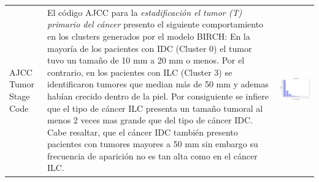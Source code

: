 \begin{table}[htb!]
	\footnotesize
	\begin{threeparttable}
		\begin{tabular}{p{2.5cm} p{7cm} p{6.5cm}} \toprule
			AJCC Tumor Stage Code 
			& 
			El código AJCC para la \textit{estadificación el tumor (T) primario del cáncer} presento el siguiente comportamiento en los clusters generados por el modelo BIRCH: En la mayoría de los pacientes con IDC (Cluster 0) el tumor tuvo un tamaño de 10 mm a 20 mm o menos. Por el contrario, en los pacientes con ILC (Cluster 3) se identificaron tumores que median más de 50 mm y ademas habían crecido dentro de la piel. Por consiguiente se infiere que el tipo de cáncer ILC presenta un tamaño tumoral al menos 2 veces mas grande que del tipo de cáncer IDC. Cabe resaltar, que el cáncer IDC también presento pacientes con tumores mayores a 50 mm sin embargo su frecuencia de aparición no es tan alta como en el cáncer ILC.
			& 
			\begin{center}\includegraphics[width=1\linewidth]{NOTEBOOK/IMAGENES_BIRCH_CLUSTERING/4_Cluster_0_tumor_stage_code}\end{center}

\end{tabular}
\end{threeparttable}
\end{table}
